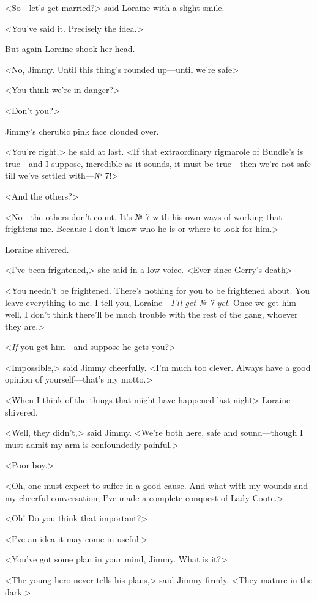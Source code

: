 <So—let's get married?> said Loraine with a slight smile.

<You've said it. Precisely the idea.>

But again Loraine shook her head.

<No, Jimmy. Until this thing's rounded up—until we're safe\longdash>

<You think we're in danger?>

<Don't you?>

Jimmy's cherubic pink face clouded over.

<You're right,> he said at last. <If that extraordinary rigmarole of Bundle's is true—and I suppose, incredible as it sounds, it must be true—then we're not safe till we've settled with—№ 7!>

<And the others?>

<No—the others don't count. It's № 7 with his own ways of working that frightens me. Because I don't know who he is or where to look for him.>

Loraine shivered.

<I've been frightened,> she said in a low voice. <Ever since Gerry's death\longdots>

<You needn't be frightened. There's nothing for you to be frightened about. You leave everything to me. I tell you, Loraine—\emph{I'll get № 7 yet}. Once we get him—well, I don't think there'll be much trouble with the rest of the gang, whoever they are.>

<\emph{If} you get him—and suppose he gets you?>

<Impossible,> said Jimmy cheerfully. <I'm much too clever. Always have a good opinion of yourself—that's my motto.>

<When I think of the things that might have happened last night\longdash> Loraine shivered.

<Well, they didn't,> said Jimmy. <We're both here, safe and sound—though I must admit my arm is confoundedly painful.>

<Poor boy.>

<Oh, one must expect to suffer in a good cause. And what with my wounds and my cheerful conversation, I've made a complete conquest of Lady Coote.>

<Oh! Do you think that important?>

<I've an idea it may come in useful.>

<You've got some plan in your mind, Jimmy. What is it?>

<The young hero never tells his plans,> said Jimmy firmly. <They mature in the dark.>


